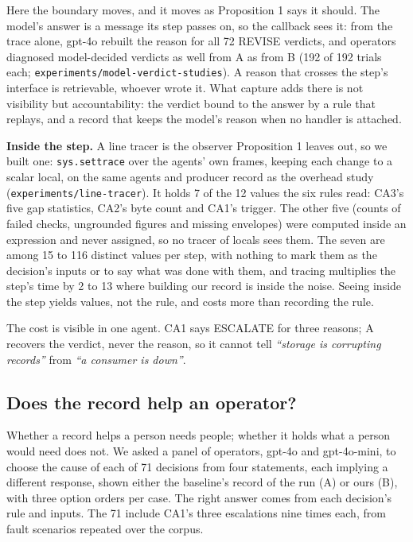 \documentclass[conference]{IEEEtran}
\begin{document}
\noindent Here the boundary moves, and it moves as Proposition 1 says it should. The model's answer is a message its step passes on, so the callback sees it: from the trace alone, gpt-4o rebuilt the reason for all 72 REVISE verdicts, and operators diagnosed model-decided verdicts as well from A as from B (192 of 192 trials each; \texttt{experiments/\allowbreak{}model-verdict-studies}). A reason that crosses the step's interface is retrievable, whoever wrote it. What capture adds there is not visibility but accountability: the verdict bound to the answer by a rule that replays, and a record that keeps the model's reason when no handler is attached.

\noindent \textbf{Inside the step.} A line tracer is the observer Proposition 1 leaves out, so we built one: \texttt{sys.\allowbreak{}settrace} over the agents' own frames, keeping each change to a scalar local, on the same agents and producer record as the overhead study (\texttt{experiments/\allowbreak{}line-tracer}). It holds 7 of the 12 values the six rules read: CA3's five gap statistics, CA2's byte count and CA1's trigger. The other five (counts of failed checks, ungrounded figures and missing envelopes) were computed inside an expression and never assigned, so no tracer of locals sees them. The seven are among 15 to 116 distinct values per step, with nothing to mark them as the decision's inputs or to say what was done with them, and tracing multiplies the step's time by 2 to 13 where building our record is inside the noise. Seeing inside the step yields values, not the rule, and costs more than recording the rule.

\noindent The cost is visible in one agent. CA1 says ESCALATE for three reasons; A recovers the verdict, never the reason, so it cannot tell \emph{``storage is corrupting records''} from \emph{``a consumer is down''}.

\subsection{Does the record help an operator?}\label{sec:5.3}

\noindent Whether a record helps a person needs people; whether it holds what a person would need does not. We asked a panel of operators, gpt-4o and gpt-4o-mini, to choose the cause of each of 71 decisions from four statements, each implying a different response, shown either the baseline's record of the run (A) or ours (B), with three option orders per case. The right answer comes from each decision's rule and inputs. The 71 include CA1's three escalations nine times each, from fault scenarios repeated over the corpus.
\end{document}
